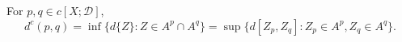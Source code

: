 For $p, q \in c[X; \mathcal{D}]$,
$$d^c(p, q) = \inf \{d\{Z\}: Z \in A^p \cap A^q\} = \sup \{d[Z_p, Z_q]: Z_p \in A^p, Z_q \in A^q\}.$$

